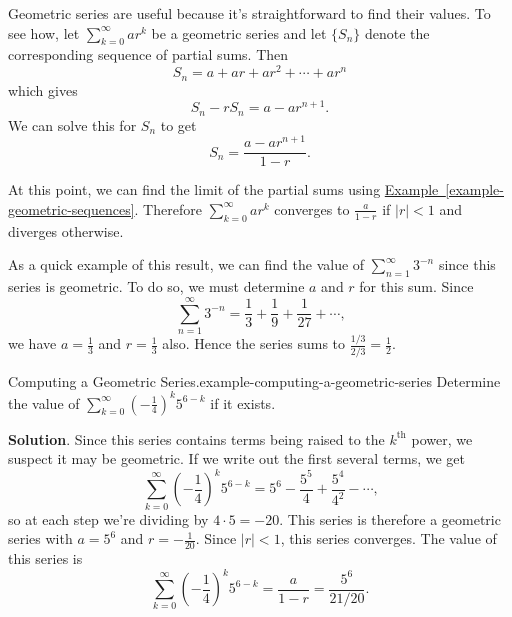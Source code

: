 \documentclass[10pt,]{book}
\numberwithin{equation}{section}
\newcommand{\lt}{<}
\begin{document}
\hypertarget{p-840}{}%
Geometric series are useful because it's straightforward to find their values. To see how, let \(\sum_{k=0}^{\infty}ar^{k}\) be a geometric series and let \(\{S_{n}\}\) denote the corresponding sequence of partial sums. Then%
\begin{equation*}
S_{n} = a + ar + ar^{2} + \cdots + ar^{n}
\end{equation*}
which gives%
\begin{equation*}
S_{n} - rS_{n} = a - ar^{n+1}\text{.}
\end{equation*}
We can solve this for \(S_{n}\) to get%
\begin{equation*}
S_{n} = \frac{a - ar^{n+1}}{1 - r}\text{.}
\end{equation*}
%
\par
\hypertarget{p-841}{}%
At this point, we can find the limit of the partial sums using \hyperref[example-geometric-sequences]{Example~\ref{example-geometric-sequences}}. Therefore \(\sum_{k=0}^{\infty}ar^{k}\) converges to \(\frac{a}{1 - r}\) if \(|r| \lt 1\) and diverges otherwise.%
\par
\hypertarget{p-842}{}%
As a quick example of this result, we can find the value of \(\sum_{n=1}^{\infty}3^{-n}\) since this series is geometric. To do so, we must determine \(a\) and \(r\) for this sum. Since%
\begin{equation*}
\sum_{n=1}^{\infty}3^{-n} = \frac{1}{3} + \frac{1}{9} + \frac{1}{27} + \cdots\text{,}
\end{equation*}
we have \(a = \frac{1}{3}\) and \(r = \frac{1}{3}\) also. Hence the series sums to \(\frac{1/3}{2/3} = \frac{1}{2}\).%
\begin{example}{Computing a Geometric Series.}{example-computing-a-geometric-series}%
\hypertarget{p-843}{}%
Determine the value of \(\sum_{k=0}^{\infty}\left(-\frac{1}{4}\right)^{k} 5^{6 - k}\) if it exists.%
\par\smallskip%
\noindent\textbf{Solution}.\hypertarget{solution-173}{}\quad%
\hypertarget{p-844}{}%
Since this series contains terms being raised to the \(k^{\text{th}}\) power, we suspect it may be geometric. If we write out the first several terms, we get%
\begin{equation*}
\sum_{k=0}^{\infty}\left(-\frac{1}{4}\right)^{k} 5^{6 - k} = 5^{6} - \frac{5^{5}}{4} + \frac{5^{4}}{4^{2}} - \cdots\text{,}
\end{equation*}
so at each step we're dividing by \(4\cdot5 = -20\). This series is therefore a geometric series with \(a = 5^{6}\) and \(r = -\frac{1}{20}\). Since \(|r| \lt 1\), this series converges. The value of this series is%
\begin{equation*}
\sum_{k=0}^{\infty}\left(-\frac{1}{4}\right)^{k} 5^{6 - k} = \frac{a}{1 - r} = \frac{5^{6}}{21/20}\text{.}
\end{equation*}
%
\end{example}
\end{document}
